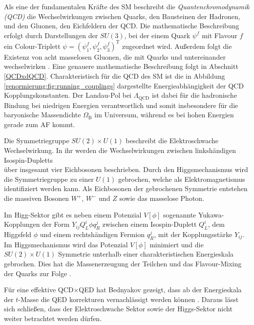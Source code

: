     Als eine der fundamentalen Kräfte des SM beschreibt die 
    \textit{Quantenchromodynamik (QCD)} die Wechselwirkungen 
    zwischen Quarks, den Bausteinen der Hadronen, und den Gluonen, den 
    Eichfeldern der QCD. Die mathematische Beschreibung erfolgt durch 
    Darstellungen der $SU(3)$, bei der einem Quark $\psi^f$ mit Flavour $f$ ein 
    Colour-Triplett $\psi = \left(\psi^f_1, \psi_2^f, \psi_3^f\right)^\text{T}$ 
    zugeordnet wird. 
    Außerdem folgt die Existenz von acht masselosen Gluonen, die mit Quarks und 
    untereinander wechselwirken \cite{Ellis_Webber}. Eine genauere 
    mathematische Beschreibung folgt in Abschnitt \ref{QCDxdQCD}. 
    Charakteristisch für die QCD des SM ist die in Abbildung 
    \ref{renormierung:fig:running_couplings} dargestellte Energieabhängigkeit 
    der QCD Kopplungskonstanten. Der Landau-Pol bei $\Lambda_\text{QCD}$ ist 
    dabei für die hadronische Bindung bei niedrigen Energien verantwortlich 
    und somit insbesondere für die baryonische Massendichte $\Omega_\text{B}$ 
    im Universum, während es bei hohen Energien gerade zum AF kommt.
    
    Die Symmetriegruppe $SU(2)\times U(1)$ beschreibt die Elektroschwache 
    Wechselwirkung. In ihr werden die Wechselwirkungen zwischen  
    linkshändigen Isospin-Dupletts 
    \begin{equation}
      
    \end{equation}
    über insgesamt vier Eichbosonen beschrieben. Durch den Higgsmechanismus 
    wird die Symmetriegruppe zu einer $U(1)$ gebrochen, welche als 
    Elektromagnetismus identifiziert werden kann. Als Eichbosonen der 
    gebrochenen Symmetrie entstehen die massiven Bosonen $W^+$, $W^-$ und $Z$ 
    sowie das masselose Photon.
    
    Im Higg-Sektor gibt es neben einem Potenzial $V[\phi]$ sogenannte 
    Yukawa-Kopplungen der 
    Form $Y_{ij} Q_L^i \phi q_R^j $
    zwischen einem Isospin-Duplett $Q_L^i$, dem Higgsfeld $\phi$ und einem 
    rechtshändigen Fermion $q_R^j$, mit der Kopplungsstärke $Y_{ij}$. Im 
    Higgsmechanismus wird das 
    Potenzial $V[\phi]$ minimiert und die $SU(2)\times U(1)$ Symmetrie 
    unterhalb einer charakteristischen Energieskala gebrochen. Dies hat 
    die Massenerzeugung der Teilchen und das Flavour-Mixing der Quarks zur 
    Folge \cite{PDG:Higgs}.
    
    Für eine effektive QCD$\times$QED 
    hat Bednyakov gezeigt, dass ab der Energieskala der $t$-Masse die QED 
    korrekturen vernachlässigt werden können \cite{Bednyakov2015262}. Daraus 
    lässt sich schließen, dass der Elektroschwache Sektor sowie der 
    Higgs-Sektor nicht weiter betrachtet werden dürfen. 
    
